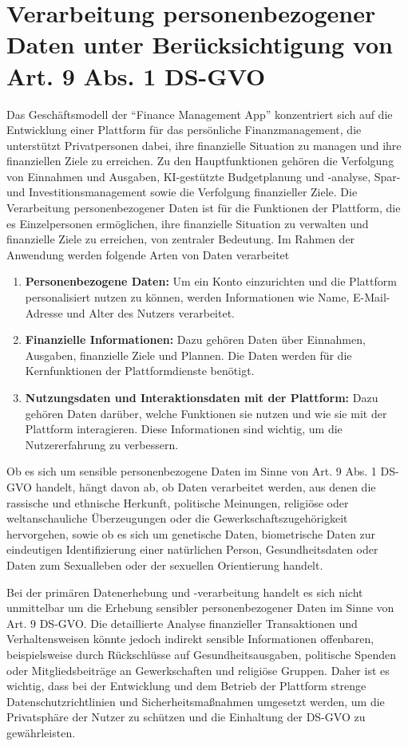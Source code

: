 \chapter{Verarbeitung personenbezogener Daten unter Berücksichtigung von Art. 9 Abs. 1 DS-GVO}

Das Geschäftsmodell der \enquote{Finance Management App} konzentriert sich auf die Entwicklung einer Plattform für das persönliche Finanzmanagement, die unterstützt Privatpersonen dabei, ihre finanzielle Situation zu managen und ihre finanziellen Ziele zu erreichen. Zu den Hauptfunktionen gehören die Verfolgung von Einnahmen und Ausgaben, KI-gestützte Budgetplanung und -analyse, Spar- und Investitionsmanagement sowie die Verfolgung finanzieller Ziele. Die Verarbeitung personenbezogener Daten ist für die Funktionen der Plattform, die es Einzelpersonen ermöglichen, ihre finanzielle Situation zu verwalten und finanzielle Ziele zu erreichen, von zentraler Bedeutung. Im Rahmen der Anwendung werden folgende Arten von Daten verarbeitet
\begin{enumerate}
    \item \textbf{Personenbezogene Daten:} 
    Um ein Konto einzurichten und die Plattform personalisiert nutzen zu können, werden Informationen wie Name, E-Mail-Adresse und Alter des Nutzers verarbeitet.
    \item \textbf{Finanzielle Informationen:} 
    Dazu gehören Daten über Einnahmen, Ausgaben, finanzielle Ziele und Plannen. Die Daten werden für die Kernfunktionen der Plattformdienste benötigt.
    \item \textbf{Nutzungsdaten und Interaktionsdaten mit der Plattform:} 
    Dazu gehören Daten darüber, welche Funktionen sie nutzen und wie sie mit der Plattform interagieren. Diese Informationen sind wichtig, um die Nutzererfahrung zu verbessern.

\end{enumerate}

Ob es sich um sensible personenbezogene Daten im Sinne von Art. 9 Abs. 1 DS-GVO handelt, hängt davon ab, ob Daten verarbeitet werden, aus denen die rassische und ethnische Herkunft, politische Meinungen, religiöse oder weltanschauliche Überzeugungen oder die Gewerkschaftszugehörigkeit hervorgehen, sowie ob es sich um genetische Daten, biometrische Daten zur eindeutigen Identifizierung einer natürlichen Person, Gesundheitsdaten oder Daten zum Sexualleben oder der sexuellen Orientierung handelt.

Bei der primären Datenerhebung und -verarbeitung handelt es sich nicht unmittelbar um die Erhebung sensibler personenbezogener Daten im Sinne von Art. 9 DS-GVO. Die detaillierte Analyse finanzieller Transaktionen und Verhaltensweisen könnte jedoch indirekt sensible Informationen offenbaren, beispielsweise durch Rückschlüsse auf Gesundheitsausgaben, politische Spenden oder Mitgliedsbeiträge an Gewerkschaften und religiöse Gruppen. Daher ist es wichtig, dass bei der Entwicklung und dem Betrieb der Plattform strenge Datenschutzrichtlinien und Sicherheitsmaßnahmen umgesetzt werden, um die Privatsphäre der Nutzer zu schützen und die Einhaltung der DS-GVO zu gewährleisten.